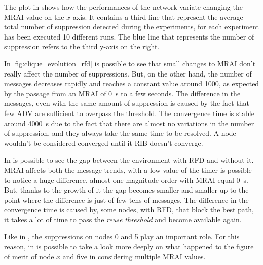 The plot in  shows how the performances of the
network variate changing the \ac{MRAI} value on the $x$ axis.
It contains a third line that represent the average total number of suppression
detected during the experiments, for each experiment has been executed \num{10} different
runs.
The blue line that represents the number of suppression refers to the third y-axis
on the right.

In \cref{fig:clique_evolution_rfd} is possible to see that small changes to \ac{MRAI}
don't really affect the number of suppressions.
But, on the other hand, the number of messages decreases rapidly and reaches a constant
value around \num{1000}, as expected by the passage from an \ac{MRAI} of \SI{0}{\second}
to a few seconds.
The difference in the messages, even with the same amount of suppression is caused
by the fact that few \ac{ADV} are sufficient to overpass the threshold.
The convergence time is stable around \SI{4000}{\second} due to the
fact that there are almost no variations in the number of suppression,
and they always take the same time to be resolved.
A node wouldn't be considered converged until it \ac{RIB} doesn't converge.

In  is possible to see the
gap between the environment with \ac{RFD} and without it.
\ac{MRAI} affects both the message trends, with a low value of the timer
is possible to notice a huge difference, almost one magnitude order with \ac{MRAI}
equal \SI{0}{\second}.
But, thanks to the growth of it the gap becomes smaller and smaller up to
the point where the difference is just of few tens of messages.
The difference in the convergence time is caused by, some
nodes, with \ac{RFD}, that block the best path, it takes a lot of time to
pass the \textit{reuse threshold} and become available again.

Like in , the suppressions on nodes \num{0} and
\num{5} play an important role.
For this reason, in  is possible to
take a look more deeply on what happened to the figure of merit
of node $x$ and five in considering multiple \ac{MRAI} values.

